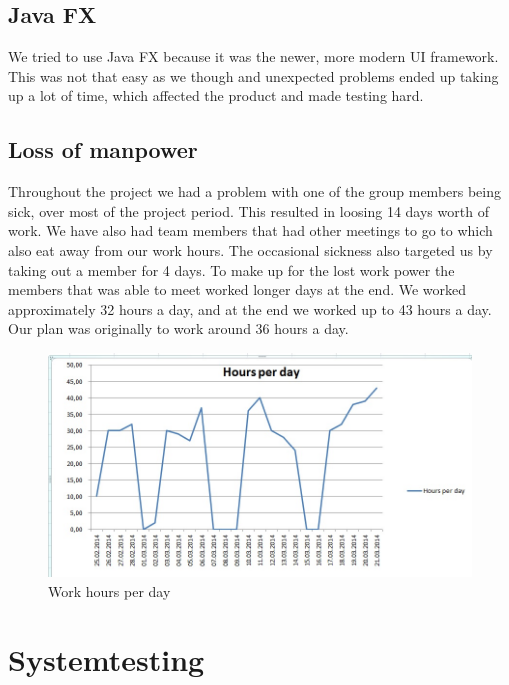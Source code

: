\documentclass[a4paper, 10pt]{article}
\begin{document}
\subsection{Java FX}
We tried to use Java FX because it was the newer, more modern UI framework. This was not that easy as we though and unexpected problems ended up taking up a lot of time, which affected the product and made testing hard.

\subsection{Loss of manpower}
Throughout the project we had a problem with one of the group members being sick, over most of the project period. This resulted in loosing 14 days worth of work. We have also had team members that had other meetings to go to which also eat away from our work hours. The occasional sickness also targeted us by taking out a member for 4 days. To make up for the lost work power the members that was able to meet worked longer days at the end. We worked approximately 32 hours a day, and at the end we worked up to 43 hours a day. Our plan was originally to work around 36 hours a day.

\begin{figure}[h!] 
    \begin{center} 
    	\includegraphics[width=15cm]{hoursPerDay.jpg}
		\caption{Work hours per day}
	\label{gantt}
	\end{center}
\end{figure}

\section{Systemtesting}
\end{document}

